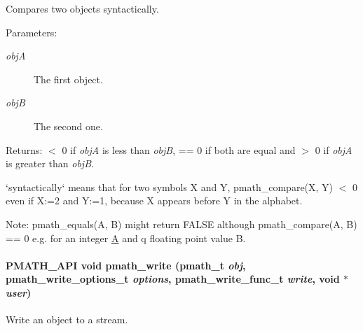 Compares two objects syntactically. 

\begin{Desc}
\item[Parameters:]
\begin{description}
\item[{\em objA}]The first object. \item[{\em objB}]The second one. \end{description}
\end{Desc}
\begin{Desc}
\item[Returns:]$<$ 0 if {\em objA\/} is less than {\em objB\/}, == 0 if both are equal and $>$ 0 if {\em objA\/} is greater than {\em objB\/}.\end{Desc}
`syntactically` means that for two symbols X and Y, pmath\_\-compare(X, Y) $<$ 0 even if X:=2 and Y:=1, because X appears before Y in the alphabet.

\begin{Desc}
\item[Note:]pmath\_\-equals(A, B) might return FALSE although pmath\_\-compare(A, B) == 0 e.g. for an integer \hyperlink{class_a}{A} and q floating point value B. \end{Desc}
\hypertarget{group__objects_g9f909b9eb04317260ee8630d10e5a7c6}{
\paragraph[{pmath\_\-write}]{\setlength{\rightskip}{0pt plus 5cm}PMATH\_\-API void pmath\_\-write ({\bf pmath\_\-t} {\em obj}, \/  {\bf pmath\_\-write\_\-options\_\-t} {\em options}, \/  {\bf pmath\_\-write\_\-func\_\-t} {\em write}, \/  void $\ast$ {\em user})}\hfill}
\label{group__objects_g9f909b9eb04317260ee8630d10e5a7c6}


Write an object to a stream. 


